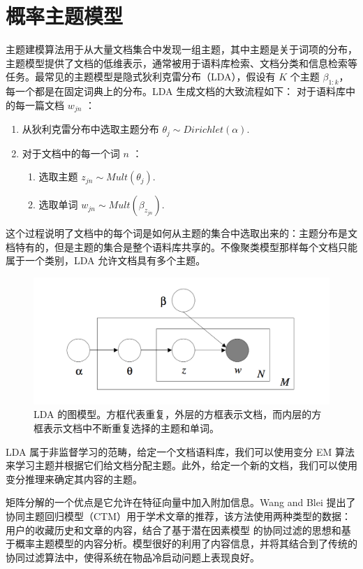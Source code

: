 \section{概率主题模型}
主题建模算法用于从大量文档集合中发现一组主题，其中主题是关于词项的分布，主题模型提供了文档的低维表示\cite{Chang2009Reading}，通常被用于语料库检索、文档分类和信息检索等任务。最常见的主题模型是隐式狄利克雷分布（LDA）\cite{Blei2003Latent}，假设有 $K$ 个主题 $\beta_{1:k}$，每一个都是在固定词典上的分布。LDA 生成文档的大致流程如下：
对于语料库中的每一篇文档 $w_{jn}$ ：
\begin{enumerate}
\item 从狄利克雷分布中选取主题分布 $\theta_j \sim Dirichlet(\alpha).$
\item 对于文档中的每一个词 $n$ ：
	\begin{enumerate}
		\item 选取主题 $z_{jn} \sim Mult(\theta_j).$
		\item 选取单词 $w_{jn} \sim Mult(\beta_{z_{jn}}).$ 
	\end{enumerate}
\end{enumerate}
这个过程说明了文档中的每个词是如何从主题的集合中选取出来的：主题分布是文档特有的，但是主题的集合是整个语料库共享的。不像聚类模型那样每个文档只能属于一个类别，LDA 允许文档具有多个主题。
\begin{figure}[htbp]
\centering
\includegraphics[width=0.7\linewidth]{images/lda.png}
\caption{LDA 的图模型。方框代表重复，外层的方框表示文档，而内层的方框表示文档中不断重复选择的主题和单词。}
\label{fig:fig1}
\end{figure}

LDA 属于非监督学习的范畴，给定一个文档语料库，我们可以使用变分 EM 算法来学习主题并根据它们给文档分配主题\cite{Blei2003Latent}。此外，给定一个新的文档，我们可以使用变分推理来确定其内容的主题。

矩阵分解的一个优点是它允许在特征向量中加入附加信息。Wang and Blei \cite{Wang2011Collaborative} 提出了协同主题回归模型（CTM）用于学术文章的推荐，该方法使用两种类型的数据：用户的收藏历史和文章的内容，结合了基于潜在因素模型 \cite{Agarwal2009Regression,Salakhutdinov2007Probabilistic} 的协同过滤的思想和基于概率主题模型的内容分析\cite{Blei2003Latent,Chang2009Reading}。模型很好的利用了内容信息，并将其结合到了传统的协同过滤算法中，使得系统在物品冷启动问题上表现良好。

